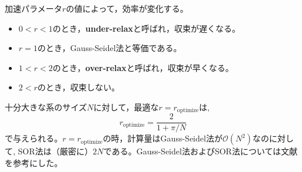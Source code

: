 \documentclass[autodetect-engine,dvi=dvipdfmx,a4paper,ja=standard,oneside,openany,11pt]{bxjsbook}
\begin{document}
加速パラメータ$r$の値によって，効率が変化する。
\begin{itemize}
  \item $0<r<1$のとき，\textbf{under-relax}と呼ばれ，収束が遅くなる。
  \item $r=1$のとき，Gauss-Seidel法と等価である。
  \item $1<r<2$のとき，\textbf{over-relax}と呼ばれ，収束が早くなる。
  \item $2<r$のとき，収束しない。
\end{itemize}
十分大きな系のサイズ$N$に対して，最適な$r=r_{\mathrm{optimize}}$は,
\begin{equation}
  r_{\mathrm{optimize}}=\frac{2}{1+\pi/N}
  \label{eq:optimaze_r}
\end{equation}
で与えられる。$r=r_{\mathrm{optimize}}$の時，計算量はGauss-Seidel法が$\mathcal{O}(N^2)$なのに対して, SOR法は（厳密に）$2N$である。Gauss-Seidel法およびSOR法については文献\cite{hinch2020numerical}を参考にした。

\ifdraft{
  
  
}{}
\end{document}
